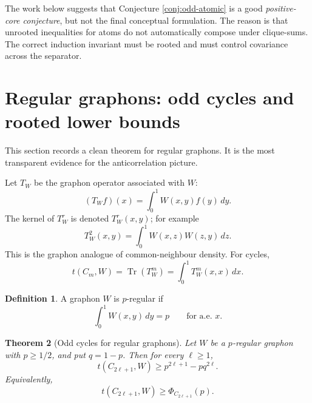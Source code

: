 \documentclass[11pt]{article}
\newtheorem{theorem}{Theorem}[section]
\theoremstyle{definition}
\newtheorem{definition}[theorem]{Definition}
\newcommand{\Tr}{\operatorname{Tr}}
\begin{document}
The work below suggests that Conjecture \ref{conj:odd-atomic} is a good \emph{positive-core conjecture}, but not the final conceptual formulation.  The reason is that unrooted inequalities for atoms do not automatically compose under clique-sums.  The correct induction invariant must be rooted and must control covariance across the separator.

\section{Regular graphons: odd cycles and rooted lower bounds}

This section records a clean theorem for regular graphons.  It is the most transparent evidence for the anticorrelation picture.

Let $T_W$ be the graphon operator associated with $W$:
\[
  (T_Wf)(x)=\int_0^1 W(x,y)f(y)\,dy.
\]
The kernel of $T_W^r$ is denoted $T_W^r(x,y)$; for example
\[
  T_W^2(x,y)=\int_0^1 W(x,z)W(z,y)\,dz.
\]
This is the graphon analogue of common-neighbour density.  For cycles,
\[
  t(C_m,W)=\Tr(T_W^m)=\int_0^1 T_W^m(x,x)\,dx.
\]

\begin{definition}
A graphon $W$ is $p$-regular if
\[
  \int_0^1 W(x,y)\,dy=p
  \qquad\text{for a.e. }x.
\]
\end{definition}

\begin{theorem}[Odd cycles for regular graphons]\label{thm:regular-odd-cycles}
Let $W$ be a $p$-regular graphon with $p\ge1/2$, and put $q=1-p$.  Then for every $\ell\ge1$,
\begin{equation}\label{eq:odd-cycle-ineq}
  t(C_{2\ell+1},W)\ge p^{2\ell+1}-p q^{2\ell}.
\end{equation}
Equivalently,
\[
  t(C_{2\ell+1},W)\ge \Phi_{C_{2\ell+1}}(p).
\]
\end{theorem}
\end{document}

